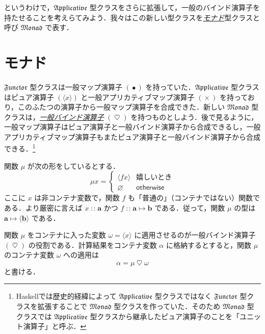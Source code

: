 \documentclass[a4paper]{jsbook}
\newcommand{\programminglanguage}[1]{\textsf{#1}}
\newcommand{\haskell}{\programminglanguage{Haskell}}
\newcommand{\keyword}[1]{{\underline{\emph{#1}}}}
\newcommand{\mPureWith}[1]{\langle#1\rangle}
\newcommand{\mType}[1]{\mathbf{#1}}
\newcommand{\mPureType}[1]{\mPureWith{\mType{#1}}}
\newcommand{\mSpecialTypeClass}[1]{\mathfrak{#1}} %
\newcommand{\mFunctorTypeClass}{\mSpecialTypeClass{Functor}}
\newcommand{\mApplicativeTypeClass}{\mSpecialTypeClass{Applicative}}
\newcommand{\mMonadTypeClass}{\mSpecialTypeClass{Monad}}
\newcommand{\mPureNothing}{\varnothing}
\newcommand{\mKeyword}[1]{\mathsf{#1}}
\newcommand{\mOtherwiseKeyword}{\mKeyword{otherwise}}
\newcommand{\mMaybe}[1]{{#1}^\text{?}}
\DeclareMathOperator{\mIn}{{:\!:}}
\DeclareMathOperator{\mMapsTo}{\mapsto}
\DeclareMathOperator{\mMap}{\bullet}
\DeclareMathOperator{\mAppMap}{\times}
\DeclareMathOperator{\mBindMaybe}{\spadesuit}%
\DeclareMathOperator{\mBind}{\heartsuit}%
\DeclareMathOperator{\mOtherwise}{\mOtherwiseKeyword}
\newcommand{\mProj}[2]{#1\mMapsTo#2}
\begin{document}

というわけで，$\mApplicativeTypeClass$ 型クラスをさらに拡張して，一般のバインド演算子を持たせることを考えらてみよう．我々はこの新しい型クラスを\keyword{モナド}型クラスと呼び $\mMonadTypeClass$ で表す．

\section{モナド}

$\mFunctorTypeClass$ 型クラスは一般マップ演算子 $(\mMap)$ を持っていた．$\mApplicativeTypeClass$ 型クラスはピュア演算子 $(\mPureWith{x})$ と一般アプリカティブマップ演算子 $(\mAppMap)$ を持っており，このふたつの演算子から一般マップ演算子を合成できた．新しい $\mMonadTypeClass$ 型クラスは，\keyword{一般バインド演算子} $(\mBind)$ を持つものとしよう．後で見るように，一般マップ演算子はピュア演算子と一般バインド演算子から合成できるし，一般アプリカティブマップ演算子もまたピュア演算子と一般バインド演算子から合成できる．\footnote{\haskell では歴史的経緯によって $\mApplicativeTypeClass$ 型クラスではなく $\mFunctorTypeClass$ 型クラスを拡張することで $\mMonadTypeClass$ 型クラスを作っていた．そのため $\mMonadTypeClass$ 型クラスでは $\mApplicativeTypeClass$ 型クラスから継承したピュア演算子のことを「ユニット演算子」と呼ぶ．}

関数 $\mu$ が次の形をしているとする．
\begin{equation}
\mu x=\begin{cases}
\mPureWith{fx}&\text{嬉しいとき}\\
\mPureNothing&\mOtherwise
\end{cases}
\end{equation}
ここに $x$ は非コンテナ変数で，関数 $f$ も「普通の」（コンテナではない）関数である．より厳密に言えば $x\mIn\mType{a}$ かつ $f\mIn\mProj{\mType{a}}{\mType{b}}$ である．従って，関数 $\mu$ の型は $\mProj{\mType{a}}{\mPureType{b}}$ である．

関数 $\mu$ をコンテナに入った変数 $\omega=\mPureWith{x}$ に適用させるのが一般バインド演算子 $(\mBind)$ の役割である．計算結果をコンテナ変数 $\alpha$ に格納するとすると，関数 $\mu$ のコンテナ変数 $\omega$ への適用は
\begin{equation}
\alpha=\mu\mBind\omega
\end{equation}
と書ける．
\end{document}
